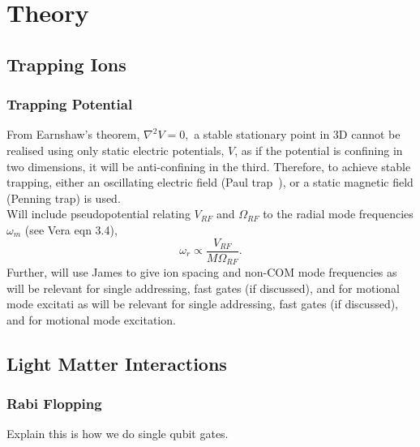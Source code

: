 \chapter{Theory}
\label{ch:theory}
\minitoc

\section{Trapping Ions}
\label{sec:Intro Ion trap}

\subsection{Trapping Potential}
    From Earnshaw's theorem,
    $\nabla^2 V = 0,$ a stable stationary point in 3D cannot be realised
    using only static electric potentials, $V$, as if the potential is confining
    in two dimensions, it will be anti-confining in the third. Therefore, to
    achieve stable trapping, either an oscillating electric field (Paul
    trap~\cite{paul1990electromagnetic}), or a static magnetic field (Penning trap) is
    used.\\
Will include pseudopotential relating $V_{RF}$ and $\Omega_{RF}$ to the radial mode frequencies $\omega_m$ (see Vera eqn 3.4),
\begin{equation}\label{eqn:pseudo_pot}
    \omega_r \propto \frac{V_{RF}}{M\Omega_{RF}}.
\end{equation}
Further, will use James to give ion spacing and non-COM mode frequencies as will be relevant for single addressing, fast gates (if discussed), and for motional mode excitati as will be relevant for single addressing, fast gates (if discussed), and for motional mode excitation.

\section{Light Matter Interactions}

\subsection{Rabi Flopping}
\label{sec:Rabi Flopping}
Explain this is how we do single qubit gates.
